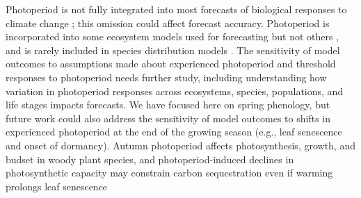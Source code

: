 \documentclass{article}
\begin{document}
\par Photoperiod is not fully integrated into most forecasts of biological responses to climate change \citep[but see][for an example in insects]{tobin2008}; this omission could affect forecast accuracy. Photoperiod is incorporated into some ecosystem models \citep[e.g., the Ecosystem Demography model] []{jolly2005,medvigy2013} used for forecasting but not others \citep[e.g.,][]{richardson2012}, and is rarely included in species distribution models \citep[e.g.,] []{morin2009,zhu2012}. The sensitivity of model outcomes to assumptions made about experienced photoperiod and threshold responses to photoperiod needs further study, including understanding how variation in photoperiod responses across ecosystems, species, populations, and life stages impacts forecasts. 
We have focused here on spring phenology, but future work could also address the sensitivity of model outcomes to shifts in experienced photoperiod at the end of the growing season (e.g., leaf senescence and onset of dormancy). Autumn photoperiod affects photosynthesis, growth, and budset in woody plant species, and photoperiod-induced declines in photosynthetic capacity may constrain carbon sequestration even if warming prolongs leaf senescence \citep[][]{Howe:1996, bauerle2012,stinziano2017}
\end{document}
